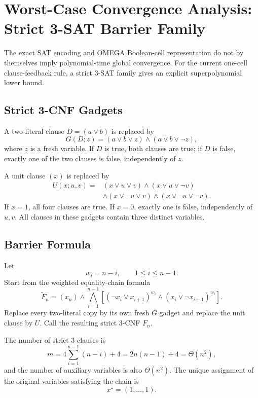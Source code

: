 \section{Worst-Case Convergence Analysis: Strict 3-SAT Barrier Family}

The exact SAT encoding and OMEGA Boolean-cell representation do not by
themselves imply polynomial-time global convergence.  For the current
one-cell clause-feedback rule, a strict 3-SAT family gives an explicit
superpolynomial lower bound.

\subsection{Strict 3-CNF Gadgets}

A two-literal clause $D=(a\lor b)$ is replaced by
\begin{equation}
G(D;z)
=
(a\lor b\lor z)
\land
(a\lor b\lor\neg z),
\end{equation}
where $z$ is a fresh variable.  If $D$ is true, both clauses are true; if
$D$ is false, exactly one of the two clauses is false, independently of $z$.

A unit clause $(x)$ is replaced by
\begin{align}
U(x;u,v)={}&
(x\lor u\lor v)
\land(x\lor u\lor\neg v)\\
&\land(x\lor\neg u\lor v)
\land(x\lor\neg u\lor\neg v).
\end{align}
If $x=1$, all four clauses are true.  If $x=0$, exactly one is false,
independently of $u,v$.  All clauses in these gadgets contain three distinct
variables.

\subsection{Barrier Formula}

Let
\begin{equation}
w_i=n-i,\qquad 1\le i\le n-1.
\end{equation}
Start from the weighted equality-chain formula
\begin{equation}
\widetilde F_n
=
(x_n)
\land
\bigwedge_{i=1}^{n-1}
\left[
(\neg x_i\lor x_{i+1})^{w_i}
\land
(x_i\lor\neg x_{i+1})^{w_i}
\right].
\end{equation}
Replace every two-literal copy by its own fresh $G$ gadget and replace the
unit clause by $U$.  Call the resulting strict 3-CNF $F_n$.

The number of strict 3-clauses is
\begin{equation}
m
=
4\sum_{i=1}^{n-1}(n-i)+4
=
2n(n-1)+4
=
\Theta(n^2),
\end{equation}
and the number of auxiliary variables is also $\Theta(n^2)$.  The unique
assignment of the original variables satisfying the chain is
\begin{equation}
x^\star=(1,\ldots,1).
\end{equation}

